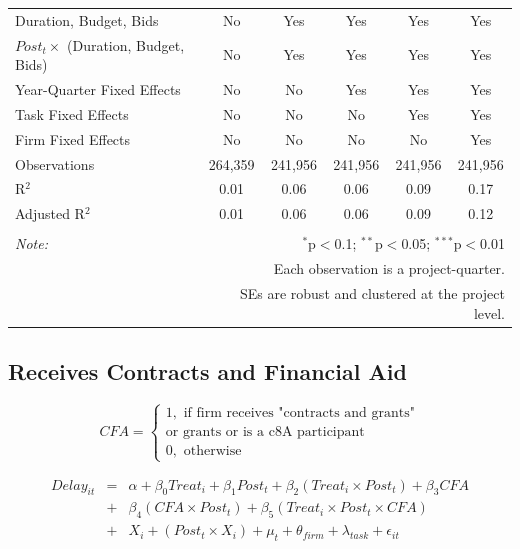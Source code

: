 \documentclass[
]{article}
\begin{document}
\begin{table}[H]
\begin{tabular}{@{\extracolsep{-2pt}}lccccc}
Duration, Budget, Bids & No & Yes & Yes & Yes & Yes \\ 
$Post_t \times $  (Duration, Budget, Bids) & No & Yes & Yes & Yes & Yes \\ 
Year-Quarter Fixed Effects & No & No & Yes & Yes & Yes \\ 
Task Fixed Effects & No & No & No & Yes & Yes \\ 
Firm Fixed Effects & No & No & No & No & Yes \\ 
Observations & 264,359 & 241,956 & 241,956 & 241,956 & 241,956 \\ 
R$^{2}$ & 0.01 & 0.06 & 0.06 & 0.09 & 0.17 \\ 
Adjusted R$^{2}$ & 0.01 & 0.06 & 0.06 & 0.09 & 0.12 \\ 
\hline 
\hline \\[-1.8ex] 
\textit{Note:}  & \multicolumn{5}{r}{$^{*}$p$<$0.1; $^{**}$p$<$0.05; $^{***}$p$<$0.01} \\ 
 & \multicolumn{5}{r}{Each observation is a project-quarter.} \\ 
 & \multicolumn{5}{r}{SEs are robust and clustered at the project level.} \\ 
\end{tabular} 
\end{table}

\hypertarget{receives-contracts-and-financial-aid}{%
\subsection{Receives Contracts and Financial
Aid}\label{receives-contracts-and-financial-aid}}

\[ CFA = \begin{cases} 1, \text{ if firm receives "contracts and grants"}\\ 
                       \text{or grants or is a c8A participant}\\
0, \text{ otherwise} \end{cases}\]

\[ \begin{aligned}
Delay_{it} &=& \alpha+\beta_0 Treat_i + \beta_1 Post_t + \beta_2 (Treat_i \times Post_t) +\beta_3 CFA \\
&+& \beta_4 (CFA \times Post_t) + \beta_5 (Treat_i \times Post_t \times CFA) \\ 
&+&X_i + (Post_t \times X_i) + \mu_t + \theta_{firm} + \lambda_{task}+ \epsilon_{it}
\end{aligned}\]
\end{document}
